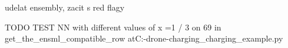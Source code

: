\documentclass[11pt]{article}
\begin{document}
udelat ensembly, zacit s red flagy

TODO TEST NN with different values of x =1 / 3 on 69 in get_the_ensml_compatible_row atC:\Users\X\Pycharms\milad{}-drone-charging\drone_charging_example\components\charger.py
  
\end{document}
